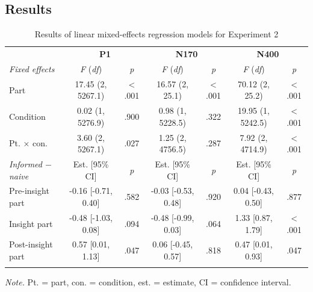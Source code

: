 \documentclass[
  english,
  man,12pt,twoside]{apa7}
\begin{document}
\hypertarget{results-1}{%
\subsection{Results}\label{results-1}}

\begin{table}[tbp]

\begin{center}
\begin{threeparttable}

\caption{\label{tab:exp2-table}Results of linear mixed-effects regression models for Experiment 2}

\footnotesize{

\begin{tabular}{lcccccc}
\toprule
 & \multicolumn{2}{c}{\textbf{P1}} & \multicolumn{2}{c}{\textbf{N170}} & \multicolumn{2}{c}{\textbf{N400}} \\
\cmidrule(r){2-3} \cmidrule(r){4-5} \cmidrule(r){6-7}
\textit{Fixed effects} & \textit{F} (\textit{df}) & \textit{p} & \textit{F} (\textit{df}) & \textit{p} & \textit{F} (\textit{df}) & \textit{p}\\
\midrule
Part & 17.45 (2, 5267.1) & < .001 & 16.57 (2, 25.1) & < .001 & 70.12 (2, 25.2) & < .001\\
Condition & 0.02 (1, 5276.9) & .900 & 0.98 (1, 5228.5) & .322 & 19.95 (1, 5242.5) & < .001\\
Pt. × con. & 3.60 (2, 5267.1) & .027 & 1.25 (2, 4756.5) & .287 & 7.92 (2, 4714.9) & < .001\\
\textit{Informed $-$  naive} & Est. [95\% CI] & \textit{p} & Est. [95\% CI] & \textit{p} & Est. [95\% CI] & \textit{p}\\ \midrule
Pre-insight part & -0.16 [-0.71, 0.40] & .582 & -0.03 [-0.53, 0.48] & .920 & 0.04 [-0.43, 0.50] & .877\\
Insight part & -0.48 [-1.03, 0.08] & .094 & -0.48 [-0.99, 0.03] & .064 & 1.33 [0.87, 1.79] & < .001\\
Post-insight part & 0.57 [0.01, 1.13] & .047 & 0.06 [-0.45, 0.57] & .818 & 0.47 [0.01, 0.93] & .047\\
\bottomrule
\addlinespace
\end{tabular}

}

\begin{tablenotes}[para]
\normalsize{\textit{Note.} Pt. = part, con. = condition, est. = estimate, CI = confidence interval.}
\end{tablenotes}

\end{threeparttable}
\end{center}

\end{table}
\end{document}
